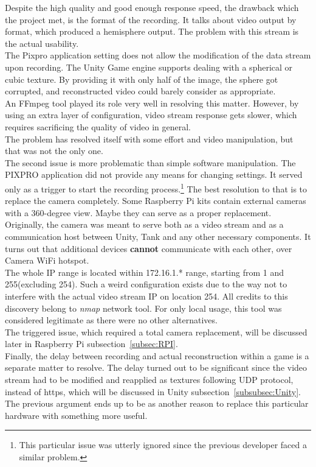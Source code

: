 Despite the high quality and good enough response speed, the drawback which the project met, is the format of the recording.
It talks about video output by format, which produced a hemisphere output. 
The problem with this stream is the actual usability.\\[1pc]
The Pixpro application setting does not allow the modification of the data stream upon recording.
The Unity Game engine supports dealing with a spherical or cubic texture. 
By providing it with only half of the image, the sphere got corrupted, and reconstructed video could barely consider as appropriate.\\[1pc]
An FFmpeg tool played its role very well in resolving this matter. 
However, by using an extra layer of configuration, video stream response gets slower, which requires sacrificing the quality of video in general. \\
The problem has resolved itself with some effort and video manipulation, but that was not the only one.\\[1pc]
The second issue is more problematic than simple software manipulation.
The PIXPRO application did not provide any means for changing settings. 
It served only as a trigger to start the recording process.\footnote{This particular issue was utterly ignored since the previous developer faced a similar problem.}
The best resolution to that is to replace the camera completely.
Some Raspberry Pi kits contain external cameras with a 360-degree view.
Maybe they can serve as a proper replacement.\\[1pc]
Originally, the camera was meant to serve both as a video stream and as a communication host between Unity, Tank and any other necessary components.
It turns out that additional devices \textbf{cannot} communicate with each other, over Camera WiFi hotspot. \\
The whole IP range is located within 172.16.1.* range, starting from 1 and 255(excluding 254). Such a weird configuration exists due to the way not to interfere with the actual video stream IP on location 254.
All credits to this discovery belong to \textit{nmap} network tool.
For only local usage, this tool was considered legitimate as there were no other alternatives.\\
The triggered issue, which required a total camera replacement, will be discussed later in Raspberry Pi subsection~\ref{subsec:RPI}.\\[1pc]
Finally, the delay between recording and actual reconstruction within a game is a separate matter to resolve.
The delay turned out to be significant since the video stream had to be modified and reapplied as textures following UDP protocol, instead of https, which will be discussed in Unity subsection~\ref{subsubsec:Unity}.
The previous argument ends up to be as another reason to replace this particular hardware with something more useful.
